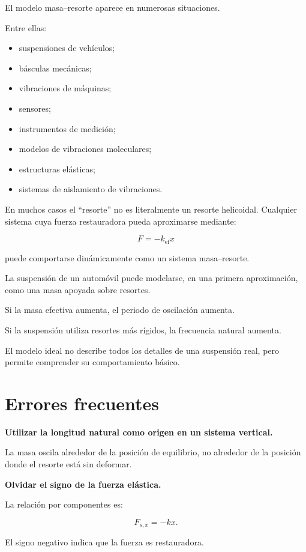 El modelo masa--resorte aparece en numerosas situaciones.

Entre ellas:

\begin{itemize}
    \item suspensiones de vehículos;
    \item básculas mecánicas;
    \item vibraciones de máquinas;
    \item sensores;
    \item instrumentos de medición;
    \item modelos de vibraciones moleculares;
    \item estructuras elásticas;
    \item sistemas de aislamiento de vibraciones.
\end{itemize}

En muchos casos el ``resorte'' no es literalmente un resorte helicoidal. Cualquier sistema cuya fuerza restauradora pueda aproximarse mediante:

\[ F=-k_{\mathrm{ef}}x \]

puede comportarse dinámicamente como un sistema masa--resorte.

\begin{aplicacion}
La suspensión de un automóvil puede modelarse, en una primera aproximación, como una masa apoyada sobre resortes.

Si la masa efectiva aumenta, el periodo de oscilación aumenta.

Si la suspensión utiliza resortes más rígidos, la frecuencia natural aumenta.

El modelo ideal no describe todos los detalles de una suspensión real, pero permite comprender su comportamiento básico.
\end{aplicacion}


\section{Errores frecuentes}

\begin{errorfrecuente}
\textbf{Utilizar la longitud natural como origen en un sistema vertical.}

La masa oscila alrededor de la posición de equilibrio, no alrededor de la posición donde el resorte está sin deformar.
\end{errorfrecuente}

\begin{errorfrecuente}
\textbf{Olvidar el signo de la fuerza elástica.}

La relación por componentes es:

\[ F_{s,x}=-kx. \]

El signo negativo indica que la fuerza es restauradora.
\end{errorfrecuente}

